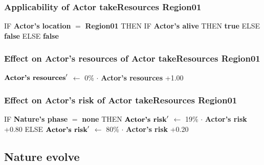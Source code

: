 \documentclass{article}%
\begin{document}
%
\subsubsection{Applicability of Actor takeResources Region01}%
\label{ssubsec:Applicability of Actor takeResources Region01}%
\begin{flushleft}%
IF %
\textbf{Actor's location}%
$=$%
\textbf{Region01}%
\linebreak%
\hspace*{2em}%
THEN %
IF %
\textbf{Actor's alive}%
\linebreak%
\hspace*{4em}%
THEN %
\textbf{true}%
\linebreak%
\hspace*{4em}%
ELSE %
\textbf{false}%
\linebreak%
\hspace*{2em}%
ELSE %
\textbf{false}%
\end{flushleft}

%
\subsubsection{Effect on Actor's resources of Actor takeResources Region01}%
\label{ssubsec:Effect on Actor's resources of Actor takeResources Region01}%
\begin{flushleft}%
$\mbox{\textbf{Actor's resources}} '$%
$\leftarrow$%
0\%%
$\cdot$%
\textbf{Actor's resources}%
+1.00%
\end{flushleft}

%
\subsubsection{Effect on Actor's risk of Actor takeResources Region01}%
\label{ssubsec:Effect on Actor's risk of Actor takeResources Region01}%
\begin{flushleft}%
IF %
\textbf{Nature's phase}%
$=$%
\textbf{none}%
\linebreak%
\hspace*{2em}%
THEN %
$\mbox{\textbf{Actor's risk}} '$%
$\leftarrow$%
19\%%
$\cdot$%
\textbf{Actor's risk}%
+0.80%
\linebreak%
\hspace*{2em}%
ELSE %
$\mbox{\textbf{Actor's risk}} '$%
$\leftarrow$%
80\%%
$\cdot$%
\textbf{Actor's risk}%
+0.20%
\end{flushleft}

%
\subsection{Nature evolve}%
\label{subsec:Nature evolve}%
\end{document}
